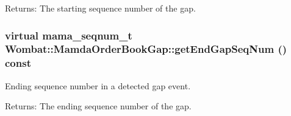 \begin{Desc}
\item[Returns:]The starting sequence number of the gap. \end{Desc}
\hypertarget{classWombat_1_1MamdaOrderBookGap_3d69b4d1f1b9c8ae0c36d261fca578f8}{
\subsubsection[getEndGapSeqNum]{\setlength{\rightskip}{0pt plus 5cm}virtual mama\_\-seqnum\_\-t Wombat::Mamda\-Order\-Book\-Gap::get\-End\-Gap\-Seq\-Num () const}}
\label{classWombat_1_1MamdaOrderBookGap_3d69b4d1f1b9c8ae0c36d261fca578f8}


Ending sequence number in a detected gap event. 

\begin{Desc}
\item[Returns:]The ending sequence number of the gap. \end{Desc}
